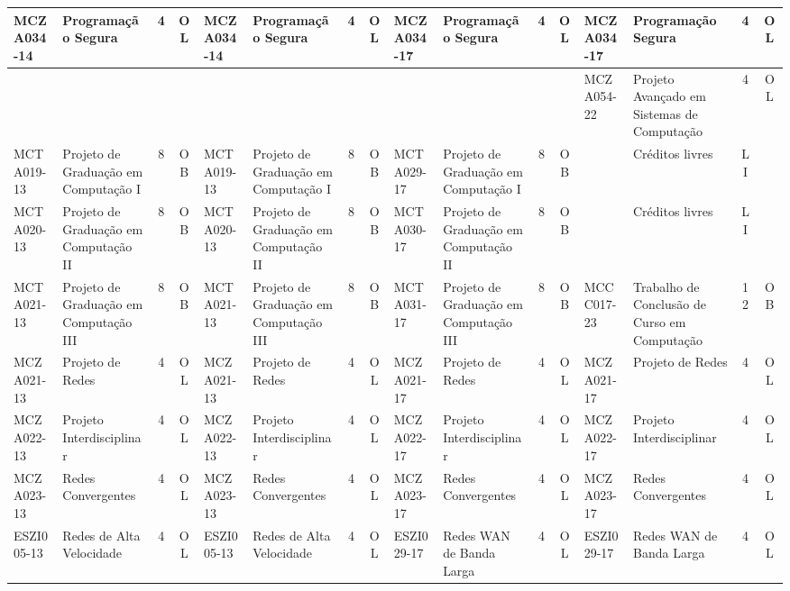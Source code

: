 \documentclass[a4paper]{article}
\begin{document}
\begin{landscape}
{\begin{longtable}{|l|p{.15\textheight}|c|c||l|p{.15\textheight}|c|c||l|p{.15\textheight}|c|c||l|p{.15\textheight}|c|c|}
    MCZA034-14 & Programação Segura & 4 & OL &
    MCZA034-14 & Programação Segura & 4 & OL &
    MCZA034-17 & Programação Segura & 4 & OL &
    MCZA034-17 & Programação Segura & 4 & OL \\ \hline
    
    & & &  &
    & & &  & 
    & & &  & 
    MCZA054-22 & Projeto Avançado em Sistemas de Computação & 4 & OL \\ \hline

    
    MCTA019-13 & Projeto de Graduação em Computação I & 8 & OB &
    MCTA019-13 & Projeto de Graduação em Computação I & 8 & OB &
    MCTA029-17 & Projeto de Graduação em Computação I & 8 & OB &
               & Créditos livres & LI &\\ \hline

    MCTA020-13 & Projeto de Graduação em Computação II & 8 & OB &
    MCTA020-13 & Projeto de Graduação em Computação II & 8 & OB &
    MCTA030-17 & Projeto de Graduação em Computação II & 8 & OB &
               & Créditos livres & LI &\\ \hline

    MCTA021-13 & Projeto de Graduação em Computação III & 8 & OB &
    MCTA021-13 & Projeto de Graduação em Computação III & 8 & OB &
    MCTA031-17 & Projeto de Graduação em Computação III & 8 & OB &
    MCCC017-23 & Trabalho de Conclusão de Curso em Computação & 12 & OB \\ \hline

    MCZA021-13 & Projeto de Redes & 4 & OL &
    MCZA021-13 & Projeto de Redes & 4 & OL &
    MCZA021-17 & Projeto de Redes & 4 & OL &
    MCZA021-17 & Projeto de Redes & 4 & OL \\ \hline

    MCZA022-13 & Projeto Interdisciplinar & 4 & OL &
    MCZA022-13 & Projeto Interdisciplinar & 4 & OL &
    MCZA022-17 & Projeto Interdisciplinar & 4 & OL &  
    MCZA022-17 & Projeto Interdisciplinar & 4 & OL \\ \hline

    MCZA023-13 & Redes Convergentes & 4 & OL &
    MCZA023-13 & Redes Convergentes & 4 & OL &
    MCZA023-17 & Redes Convergentes & 4 & OL &
    MCZA023-17 & Redes Convergentes & 4 & OL \\ \hline

    ESZI005-13 & Redes de Alta Velocidade & 4 & OL &
    ESZI005-13 & Redes de Alta Velocidade & 4 & OL &
    ESZI029-17 & Redes WAN de Banda Larga & 4 & OL &
    ESZI029-17 & Redes WAN de Banda Larga & 4 & OL \\ \hline


\end{longtable}}
\end{landscape}
\end{document}

